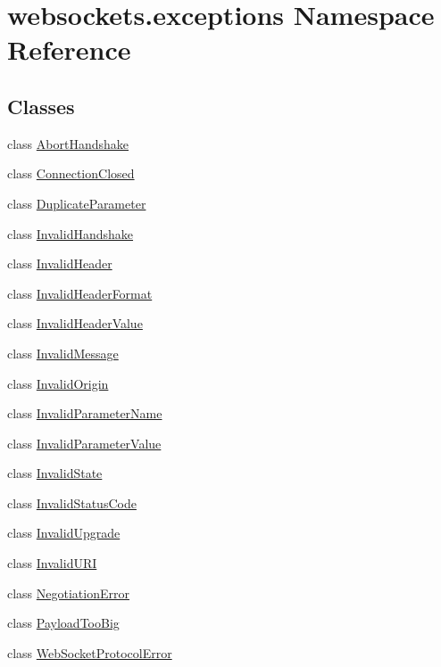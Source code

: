 \hypertarget{namespacewebsockets_1_1exceptions}{}\section{websockets.\+exceptions Namespace Reference}
\label{namespacewebsockets_1_1exceptions}
\subsection*{Classes}
\begin{DoxyCompactItemize}
\item 
class \hyperlink{classwebsockets_1_1exceptions_1_1_abort_handshake}{Abort\+Handshake}
\item 
class \hyperlink{classwebsockets_1_1exceptions_1_1_connection_closed}{Connection\+Closed}
\item 
class \hyperlink{classwebsockets_1_1exceptions_1_1_duplicate_parameter}{Duplicate\+Parameter}
\item 
class \hyperlink{classwebsockets_1_1exceptions_1_1_invalid_handshake}{Invalid\+Handshake}
\item 
class \hyperlink{classwebsockets_1_1exceptions_1_1_invalid_header}{Invalid\+Header}
\item 
class \hyperlink{classwebsockets_1_1exceptions_1_1_invalid_header_format}{Invalid\+Header\+Format}
\item 
class \hyperlink{classwebsockets_1_1exceptions_1_1_invalid_header_value}{Invalid\+Header\+Value}
\item 
class \hyperlink{classwebsockets_1_1exceptions_1_1_invalid_message}{Invalid\+Message}
\item 
class \hyperlink{classwebsockets_1_1exceptions_1_1_invalid_origin}{Invalid\+Origin}
\item 
class \hyperlink{classwebsockets_1_1exceptions_1_1_invalid_parameter_name}{Invalid\+Parameter\+Name}
\item 
class \hyperlink{classwebsockets_1_1exceptions_1_1_invalid_parameter_value}{Invalid\+Parameter\+Value}
\item 
class \hyperlink{classwebsockets_1_1exceptions_1_1_invalid_state}{Invalid\+State}
\item 
class \hyperlink{classwebsockets_1_1exceptions_1_1_invalid_status_code}{Invalid\+Status\+Code}
\item 
class \hyperlink{classwebsockets_1_1exceptions_1_1_invalid_upgrade}{Invalid\+Upgrade}
\item 
class \hyperlink{classwebsockets_1_1exceptions_1_1_invalid_u_r_i}{Invalid\+U\+RI}
\item 
class \hyperlink{classwebsockets_1_1exceptions_1_1_negotiation_error}{Negotiation\+Error}
\item 
class \hyperlink{classwebsockets_1_1exceptions_1_1_payload_too_big}{Payload\+Too\+Big}
\item 
class \hyperlink{classwebsockets_1_1exceptions_1_1_web_socket_protocol_error}{Web\+Socket\+Protocol\+Error}
\end{DoxyCompactItemize}
